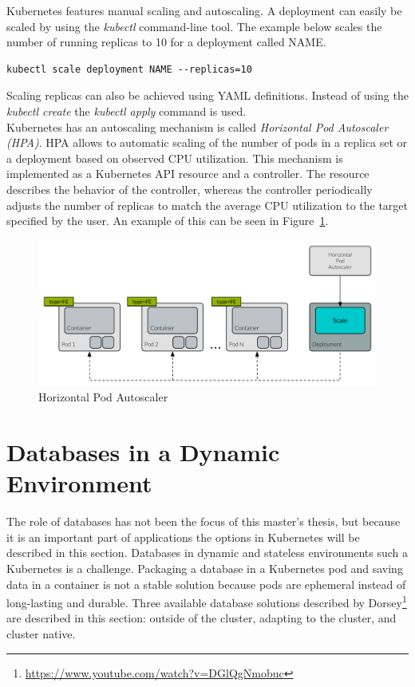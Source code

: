 Kubernetes features manual scaling and autoscaling. A deployment can easily be scaled by using the \textit{kubectl} command-line tool. The example below scales the number of running replicas to 10 for a deployment called NAME. \\

\begin{lstlisting}
kubectl scale deployment NAME --replicas=10
\end{lstlisting}

\noindent
Scaling replicas can also be achieved using YAML definitions. Instead of using the \textit{kubectl create} the  \textit{kubectl apply} command is used. \\


\noindent Kubernetes has an autoscaling mechanism is called \textit{Horizontal Pod Autoscaler (HPA)}. HPA allows to automatic scaling of the number of pods in a replica set or a deployment based on observed CPU utilization. This mechanism is implemented as a Kubernetes API resource and a controller. The resource describes the behavior of the controller, whereas the controller periodically adjusts the number of replicas to match the average CPU utilization to the target specified by the user. An example of this can be seen in Figure~\ref{fig:hpa}. 

\begin{figure}[H]
    \centering
    \includegraphics[width=15cm]{figures/kubernetes/autoscale}
    \caption{Horizontal Pod Autoscaler}
    \label{fig:hpa}
\end{figure}


\section*{Databases in a Dynamic Environment}
The role of databases has not been the focus of this master's thesis, but because it is an important part of applications the options in Kubernetes will be described in this section. Databases in dynamic and stateless environments such a Kubernetes is a challenge. Packaging a database in a Kubernetes pod and saving data in a container is not a stable solution because pods are ephemeral instead of long-lasting and durable. Three available database solutions described by Dorsey\footnote{\url{https://www.youtube.com/watch?v=DGlQgNmobuc}} are described in this section: outside of the cluster, adapting to the cluster, and cluster native.


